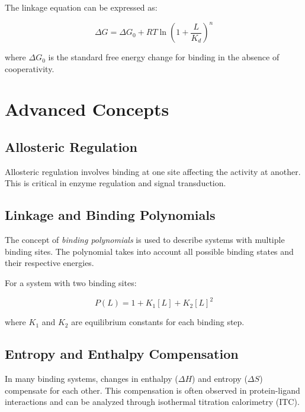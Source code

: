 \documentclass[english,course]{lecture}
\begin{document}
The linkage equation can be expressed as:

\[
\Delta G = \Delta G_0 + RT \ln \left(1 + \frac{L}{K_d}\right)^n
\]

where \(\Delta G_0\) is the standard free energy change for binding in the absence of cooperativity.

\vfill
\eject


\section{Advanced Concepts}

\subsection{Allosteric Regulation}

Allosteric regulation involves binding at one site affecting the activity at another. This is critical in enzyme regulation and signal transduction.

\subsection{Linkage and Binding Polynomials}

The concept of \emph{binding polynomials} is used to describe systems with multiple binding sites. The polynomial takes into account all possible binding states and their respective energies.

For a system with two binding sites:

\[
P(L) = 1 + K_1[L] + K_2[L]^2
\]

where \(K_1\) and \(K_2\) are equilibrium constants for each binding step.

\subsection{Entropy and Enthalpy Compensation}

In many binding systems, changes in enthalpy (\(\Delta H\)) and entropy (\(\Delta S\)) compensate for each other. This compensation is often observed in protein-ligand interactions and can be analyzed through isothermal titration calorimetry (ITC).
\end{document}
